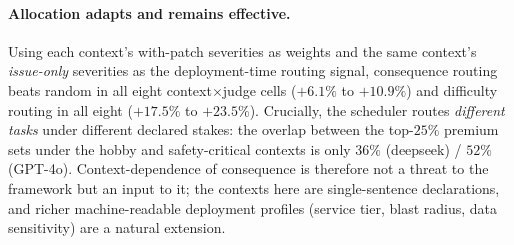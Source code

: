 \documentclass{article}
\begin{document}
\paragraph{Allocation adapts and remains effective.} Using each
context's with-patch severities as weights and the same context's
\emph{issue-only} severities as the deployment-time routing signal,
consequence routing beats random in all eight context$\times$judge
cells ($+6.1\%$ to $+10.9\%$) and difficulty routing in all eight
($+17.5\%$ to $+23.5\%$). Crucially, the scheduler routes
\emph{different tasks} under different declared stakes: the overlap
between the top-$25\%$ premium sets under the hobby and
safety-critical contexts is only $36\%$ (deepseek) / $52\%$
(GPT-4o). Context-dependence of consequence is therefore not a
threat to the framework but an input to it; the contexts here are
single-sentence declarations, and richer machine-readable deployment
profiles (service tier, blast radius, data sensitivity) are a
natural extension.
\end{document}
